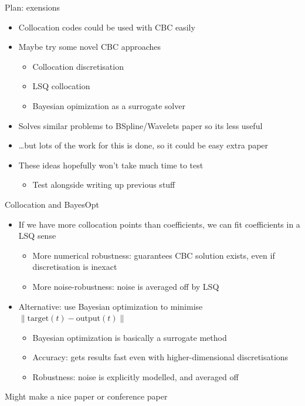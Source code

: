 \documentclass[presentation]{beamer}
\begin{document}
\begin{frame}[label={sec:org96bf7f4}]{Plan: exensions}
\begin{itemize}
\item Collocation codes could be used with CBC easily
\item Maybe try some novel CBC approaches
\begin{itemize}
\item Collocation discretisation
\item LSQ collocation
\item Bayesian opimization as a surrogate solver
\end{itemize}
\end{itemize}
\vfill
\begin{itemize}
\item Solves similar problems to BSpline/Wavelets paper so its less useful
\item \ldots{}but lots of the work for this is done, so it could be easy extra paper
\item These ideas hopefully won't take much time to test
\begin{itemize}
\item Test alongside writing up previous stuff
\end{itemize}
\end{itemize}
\end{frame}

\begin{frame}[label={sec:org7e7649f}]{Collocation and BayesOpt}
\begin{itemize}
\item If we have more collocation points than coefficients, we can fit coefficients in a LSQ sense
\begin{itemize}
\item More numerical robustness: guarantees CBC solution exists, even if discretisation is inexact
\item More noise-robustness: noise is averaged off by LSQ
\end{itemize}
\end{itemize}
\vfill
\begin{itemize}
\item Alternative: use Bayesian optimization to minimise \(\|\text{target}(t)-\text{output}(t)\|\)
\begin{itemize}
\item Bayesian optimization is basically a surrogate method
\item Accuracy: gets results fast even with higher-dimensional discretisations
\item Robustness: noise is explicitly modelled, and averaged off
\end{itemize}
\end{itemize}
\vfill
Might make a nice paper or conference paper
\end{frame}
\end{document}
